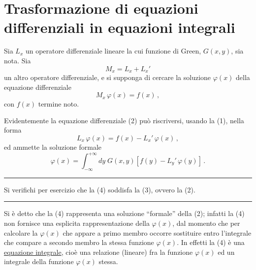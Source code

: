 \documentclass[11pt, a4paper]{book}
\numberwithin{equation}{section}
\begin{document}
\section{Trasformazione di equazioni differenziali in equazioni integrali}

Sia $L_x$ un operatore differenziale lineare la cui funzione di Green, $G(x,y)$, sia nota. Sia
\begin{equation}
\tag{1} M_x = L_x + L_x'
\end{equation}
un altro operatore differenziale, e si supponga di cercare la soluzione $\varphi(x)$ della equazione differenziale
\begin{equation}
\tag{2} M_x\,\varphi(x) = f(x)\,,
\end{equation}
con $f(x)$ termine noto.

Evidentemente la equazione differenziale (2) può riscriversi, usando la (1), nella forma
\begin{equation}
\tag{3} L_x\,\varphi(x) = f(x) - L_x'\,\varphi(x)\,,
\end{equation}
ed ammette la soluzione formale
\begin{equation}
\tag{4} \varphi(x) = \int_{-\infty}^{+\infty} dy\; G(x,y)\left[f(y) - L_y'\,\varphi(y)\right]\,.
\end{equation}

\noindent\rule{\linewidth}{0.4pt}

\noindent Si verifichi per esercizio che la (4) soddisfa la (3), ovvero la (2).

\noindent\rule{\linewidth}{0.4pt}

Si è detto che la (4) rappresenta una soluzione ``formale'' della (2); infatti la (4) non fornisce una esplicita rappresentazione della $\varphi(x)$, dal momento che per calcolare la $\varphi(x)$ che appare a primo membro occorre sostituire entro l'integrale che compare a secondo membro la stessa funzione $\varphi(x)$. In effetti la (4) è una \uline{equazione integrale}, cioè una relazione (lineare) fra la funzione $\varphi(x)$ ed un integrale della funzione $\varphi(x)$ stessa.

\end{document}
